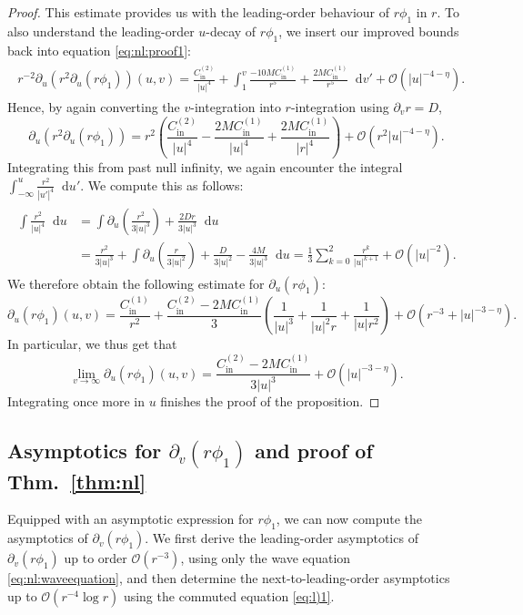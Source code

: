 \documentclass[11pt,english]{article}
\numberwithin{equation}{section}
\theoremstyle{remark}
\theoremstyle{plain}
\theoremstyle{remark}
\newcommand{\dd}{\mathop{}\!\mathrm{d}}
\newcommand{\pu}{\partial_u}
\newcommand{\pv}{\partial_v}
\renewcommand{\(}{\left(}
\renewcommand{\)}{\right)}
\newcommand{\cc}{C_{\mathrm{in}}^{(1)}}
\newcommand{\ccc}{C_{\mathrm{in}}^{(2)}}
\newcommand{\pho}{(r\phi_1)}
\begin{document}
\begin{proof}
This estimate provides us with the leading-order behaviour of $r\phi_1$ in $r$. 
To also understand the leading-order $u$-decay of $r\phi_1$, we insert our improved bounds back into equation \eqref{eq:nl:proof1}:
\begin{align}
\begin{split}
r^{-2}\pu(r^2\pu\pho)(u,v)=\frac{\ccc}{|u|^4}
+\int_{1}^v\frac{-10M\cc}{r^5}+\frac{2M\cc}{r^5}\dd v' 
+\mathcal{O}(|u|^{-4-\eta}).
\end{split}
\end{align}
 Hence, by again converting the $v$-integration into $r$-integration using $\pv r=D$,
\begin{equation}
\pu(r^2\pu\pho)=r^2\left( \frac{\ccc}{|u|^4}-\frac{2M\cc}{|u|^4}+\frac{2M\cc}{|r|^4}\right)+\mathcal{O}(r^2|u|^{-4-\eta}).
\end{equation}
Integrating this from past null infinity, we again encounter the integral 
$\int_{-\infty}^u\frac{r^2}{|u'|^4}\dd u'$. We compute this as follows:
\begin{align}\label{eq:nl:stupidintegral1}
\begin{split}
\int\frac{r^2}{|u|^4}\dd u&=\int \pu\left(\frac{r^2}{3|u|^3}\right)+\frac{2Dr}{3|u|^3}\dd u\\
&=\frac{r^2}{3|u|^3}+\int \pu\left(\frac{r}{3|u|^2}\right)+\frac{D}{3|u|^2}-\frac{4M}{3|u|^3}\dd u
=\frac{1}{3}\sum_{k=0}^2\frac{r^k}{|u|^{k+1}}+\mathcal{O}(|u|^{-2}).
\end{split}
\end{align}
We therefore obtain the following estimate for $\pu\pho$:
\begin{equation}
\pu\pho(u,v)=\frac{\cc}{r^2}+\frac{\ccc-2M\cc}{3}\left(\frac{1}{|u|^3}+\frac{1}{|u|^2r}+\frac{1}{|u|r^2}\right)+\mathcal{O}(r^{-3}+|u|^{-3-\eta}).
\end{equation}
In particular, we thus get that
\begin{equation}
\lim_{v\to\infty}\pu(r\phi_1)(u,v)=\frac{\ccc-2M\cc}{3|u|^3}+\mathcal{O}(|u|^{-3-\eta}).
\end{equation}
Integrating once more in $u$ finishes the proof of the proposition.
\end{proof}

\subsection{Asymptotics for \texorpdfstring{$\pv(r\phi_1)$}{d/dv(r phi1)} and proof of Thm.~\ref{thm:nl}}\label{sec:nl:dvphi}
Equipped with an asymptotic expression for $r\phi_1$, we can now compute the asymptotics of $\pv(r\phi_1)$. We first derive the leading-order asymptotics of $\pv\pho$ up to order $\mathcal{O}(r^{-3})$,  using only the wave equation \eqref{eq:nl:waveequation}, and then determine the next-to-leading-order asymptotics up to $\mathcal{O}(r^{-4}\log r)$ using the commuted equation \eqref{eq:l)1}.
\end{document}

